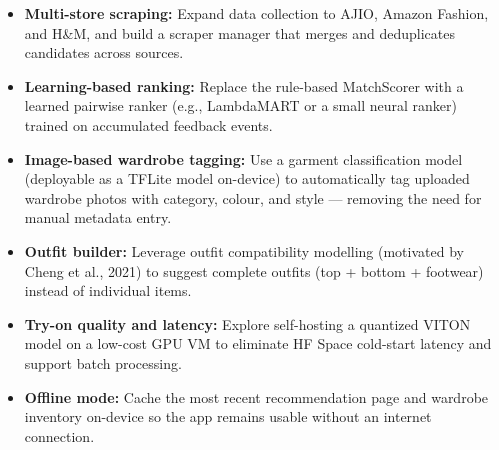 \documentclass[12pt,a4paper]{report}
\begin{document}
\begin{itemize}
  \item \textbf{Multi-store scraping:} Expand data collection to AJIO, Amazon Fashion, and H\&M, and build a scraper manager that merges and deduplicates candidates across sources.
  \item \textbf{Learning-based ranking:} Replace the rule-based MatchScorer with a learned pairwise ranker (e.g., LambdaMART or a small neural ranker) trained on accumulated feedback events.
  \item \textbf{Image-based wardrobe tagging:} Use a garment classification model (deployable as a TFLite model on-device) to automatically tag uploaded wardrobe photos with category, colour, and style --- removing the need for manual metadata entry.
  \item \textbf{Outfit builder:} Leverage outfit compatibility modelling (motivated by Cheng et al., 2021) to suggest complete outfits (top + bottom + footwear) instead of individual items.
  \item \textbf{Try-on quality and latency:} Explore self-hosting a quantized VITON model on a low-cost GPU VM to eliminate HF Space cold-start latency and support batch processing.
  \item \textbf{Offline mode:} Cache the most recent recommendation page and wardrobe inventory on-device so the app remains usable without an internet connection.
\end{itemize}
\end{document}
